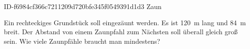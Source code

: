 \begin{exercise}
      {ID-f6984cf366c7211209d720bfe345f0549391d1d3}
      {Zaun}
  \ifproblem\problem\par
    Ein rechteckiges Grundstück soll eingezäunt werden.
    Es ist \SI{120}{\metre} lang und \SI{84}{\metre}
    breit. Der Abstand von einem Zaunpfahl zum Nächsten
    soll überall gleich groß sein.
    Wie viele Zaunpfähle braucht man mindestens?
  \fi
\end{exercise}
